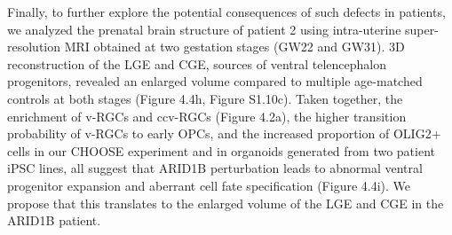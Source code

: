 Finally, to further explore the potential consequences of such defects in patients, we analyzed the prenatal brain structure of patient 2 using intra-uterine super-resolution MRI obtained at two gestation stages (GW22 and GW31). 3D reconstruction of the LGE and CGE, sources of ventral telencephalon progenitors, revealed an enlarged volume compared to multiple age-matched controls at both stages (Figure 4.4h, Figure S1.10c). Taken together, the enrichment of v-RGCs and ccv-RGCs (Figure 4.2a), the higher transition probability of v-RGCs to early OPCs, and the increased proportion of OLIG2+ cells in our CHOOSE experiment and in organoids generated from two patient iPSC lines, all suggest that ARID1B perturbation leads to abnormal ventral progenitor expansion and aberrant cell fate specification (Figure 4.4i). We propose that this translates to the enlarged volume of the LGE and CGE in the ARID1B patient.


